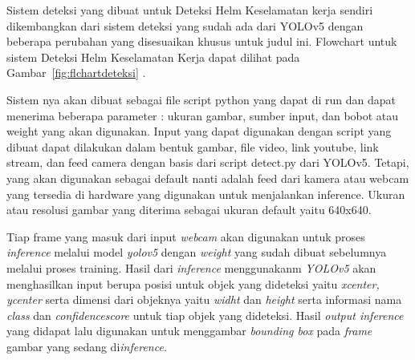Sistem deteksi yang dibuat untuk Deteksi Helm Keselamatan kerja sendiri dikembangkan dari sistem deteksi yang sudah ada dari YOLOv5 dengan beberapa perubahan yang disesuaikan khusus untuk judul ini. Flowchart untuk sistem Deteksi Helm Keselamatan Kerja dapat dilihat pada Gambar~\ref{fig:flchartdeteksi} .


Sistem nya akan dibuat sebagai file script python yang dapat di run dan dapat menerima beberapa parameter : ukuran gambar, sumber input, dan bobot atau weight yang akan digunakan. 
Input yang dapat digunakan dengan script yang dibuat dapat dilakukan dalam bentuk gambar, file video, link youtube, link stream, dan feed camera dengan basis dari script detect.py dari YOLOv5. Tetapi, yang akan digunakan sebagai default nanti adalah feed dari kamera atau webcam yang tersedia di hardware yang digunakan untuk menjalankan inference. Ukuran atau resolusi gambar yang diterima sebagai ukuran default yaitu 640x640. 


Tiap frame yang masuk dari input \emph{webcam} akan digunakan untuk proses \emph{inference} melalui model \emph{yolov5} dengan \emph{weight} yang sudah dibuat sebelumnya melalui proses training. Hasil dari \emph{inference} menggunakanm \emph{YOLOv5} akan menghasilkan input berupa posisi untuk objek yang dideteksi yaitu \emph{xcenter, ycenter} serta dimensi dari objeknya yaitu \emph{widht} dan \emph{height} serta informasi nama \emph{class} dan \emph{confidence\textunderscore score} untuk tiap objek yang dideteksi. Hasil \emph{output inference} yang didapat lalu digunakan untuk menggambar \emph{bounding box} pada \emph{frame} gambar yang sedang di\emph{inference}.



